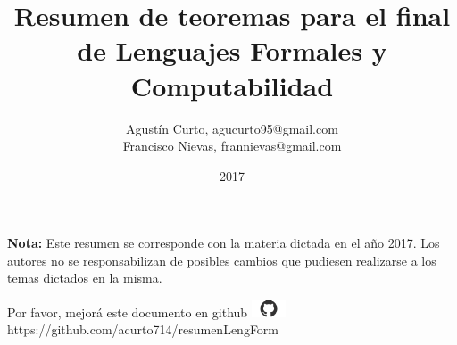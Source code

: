 \documentclass[12pt,a4paper]{article}
\author{Agustín Curto, agucurto95@gmail.com \\
			 Francisco Nievas, frannievas@gmail.com}
\title{Resumen de teoremas para el final \\ de Lenguajes Formales y Computabilidad}
\date{2017}
\begin{document}
	\clearpage\maketitle
 	\thispagestyle{empty}
 	\tableofcontents

	\vspace{5cm}
	\begin{center}
		\textbf{Nota:} Este resumen se corresponde con la materia dictada en el año 2017. Los autores no se responsabilizan
		de posibles cambios que pudiesen realizarse a los temas dictados en la misma.
	\end{center}

	\vspace{\fill}
	\begin{center}
		Por favor, mejorá este documento en github
		\includegraphics[width=1cm]{graphics/github.png} \\
		https://github.com/acurto714/resumenLengForm
	\end{center}

	\pagebreak

	
	
	
	
	
	
\end{document}

